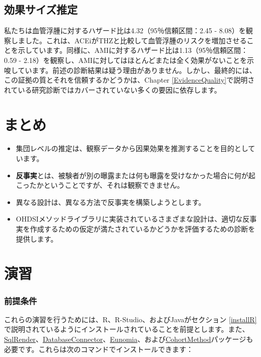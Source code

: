 \documentclass[
  11pt]{book}
\makeatletter
\newenvironment{kframe}{%
\medskip{}
\setlength{\fboxsep}{.8em}
 \def\at@end@of@kframe{}%
 \ifinner\ifhmode%
  \def\at@end@of@kframe{\end{minipage}}%
  \begin{minipage}{\columnwidth}%
 \fi\fi%
 \def\FrameCommand##1{\hskip\@totalleftmargin \hskip-\fboxsep
 \colorbox{myShadeColor}{##1}\hskip-\fboxsep
     \hskip-\linewidth \hskip-\@totalleftmargin \hskip\columnwidth}%
 \MakeFramed {\advance\hsize-\width
   \@totalleftmargin\z@ \linewidth\hsize
   \@setminipage}}%
 {\par\unskip\endMakeFramed%
 \at@end@of@kframe}
\newenvironment{rmdblock}[1]
  {
  \begin{itemize}
  \renewcommand{\labelitemi}{
    \raisebox{-.7\height}[0pt][0pt]{
      {\setkeys{Gin}{width=3em,keepaspectratio}\texttt{[image: images/\#1]}}
    }
  }
  \setlength{\fboxsep}{1em}
  \begin{kframe}
  \item
  }
  {
  \end{kframe}
  \end{itemize}
  }
\newenvironment{rmdsummary}
  {\begin{rmdblock}{summary}}
  {\end{rmdblock}}
\theoremstyle{definition}
\theoremstyle{definition}
\theoremstyle{definition}
\theoremstyle{definition}
\theoremstyle{remark}
\makeatother
\begin{document}
\subsection{効果サイズ推定}\label{ux52b9ux679cux30b5ux30a4ux30baux63a8ux5b9a}

私たちは血管浮腫に対するハザード比は4.32（95％信頼区間：2.45 - 8.08）を観察しました。これは、ACEiがTHZと比較して血管浮腫のリスクを増加させることを示しています。同様に、AMIに対するハザード比は1.13（95％信頼区間：0.59 - 2.18）を観察し、AMIに対してはほとんどまたは全く効果がないことを示唆しています。前述の診断結果は疑う理由がありません。しかし、最終的には、この証拠の質とそれを信頼するかどうかは、Chapter \ref{EvidenceQuality}で説明されている研究診断ではカバーされていない多くの要因に依存します。

\section{まとめ}\label{ux307eux3068ux3081-9}

\begin{rmdsummary}
\begin{itemize}
\item
  集団レベルの推定は、観察データから因果効果を推測することを目的としています。
\item
  \textbf{反事実}とは、被験者が別の曝露または何も曝露を受けなかった場合に何が起こったかということですが、それは観察できません。
\item
  異なる設計は、異なる方法で反事実を構築しようとします。
\item
  OHDSIメソッドライブラリに実装されているさまざまな設計は、適切な反事実を作成するための仮定が満たされているかどうかを評価するための診断を提供します。
\end{itemize}
\end{rmdsummary}

\section{演習}\label{ux6f14ux7fd2-5}

\subsubsection*{前提条件}\label{ux524dux63d0ux6761ux4ef6-7}

これらの演習を行うためには、R、R-Studio、およびJavaがセクション \ref{installR} で説明されているようにインストールされていることを前提とします。また、\href{https://ohdsi.github.io/SqlRender/}{SqlRender}、\href{https://ohdsi.github.io/DatabaseConnector/}{DatabaseConnector}、\href{https://ohdsi.github.io/Eunomia/}{Eunomia}、および\href{https://ohdsi.github.io/CohortMethod/}{CohortMethod}パッケージも必要です。これらは次のコマンドでインストールできます：
\end{document}
